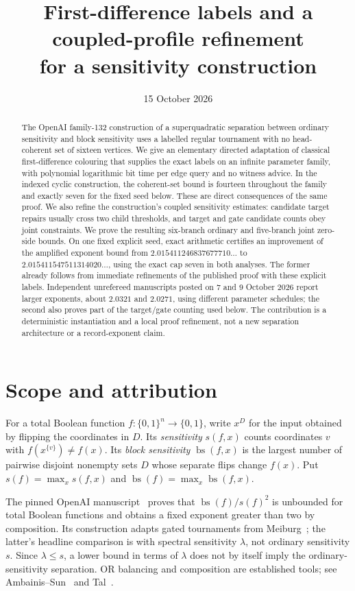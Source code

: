 \documentclass[11pt]{amsart}
\title[Explicit labels and refined sensitivity profiles]{First-difference labels and a coupled-profile refinement\texorpdfstring{\\}{} for a sensitivity construction}
\date{15 October 2026}
\theoremstyle{definition}
\theoremstyle{remark}
\newcommand{\bs}{\operatorname{bs}}
\begin{document}
\begin{abstract}
The OpenAI family-132 construction of a superquadratic separation between
ordinary sensitivity and block sensitivity uses a labelled regular tournament
with no head-coherent set of sixteen vertices. We give an elementary directed
adaptation of classical first-difference colouring that supplies the exact
labels on an infinite parameter family, with polynomial logarithmic bit time
per edge query and no witness advice. In the indexed cyclic construction,
the coherent-set bound is fourteen throughout the family and exactly seven
for the fixed seed below. These are direct consequences of the same proof.
We also refine the construction's
coupled sensitivity estimates: candidate target repairs usually cross two
child thresholds, and target and gate candidate counts obey joint constraints.
We prove the resulting six-branch ordinary and five-branch joint zero-side
bounds. On one fixed explicit seed, exact arithmetic certifies an improvement
of the amplified exponent bound from
$2.015411246837677710\ldots$ to $2.015411547511314020\ldots$,
using the exact cap seven in both analyses. The former already follows from
immediate refinements of the published proof with these explicit labels.
Independent unrefereed manuscripts posted on 7 and 9 October 2026 report
larger exponents, about $2.0321$ and $2.0271$, using different parameter
schedules; the second also proves part of the target/gate counting used
below.
The contribution is a deterministic instantiation and a local proof
refinement, not a new separation architecture or a record-exponent claim.
\end{abstract}
\maketitle

\section{Scope and attribution}
For a total Boolean function $f:\{0,1\}^n\to\{0,1\}$, write $x^D$ for
the input obtained by flipping the coordinates in $D$. Its \emph{sensitivity}
$s(f,x)$ counts coordinates $v$ with $f(x^{\{v\}})\ne f(x)$.
Its \emph{block sensitivity} $\bs(f,x)$ is the largest number of pairwise
disjoint nonempty sets $D$ whose separate flips change $f(x)$. Put
$s(f)=\max_xs(f,x)$ and $\bs(f)=\max_x\bs(f,x)$.

The pinned OpenAI manuscript~\cite{OpenAI132} proves that
$\bs(f)/s(f)^2$ is unbounded for total Boolean functions and obtains a
fixed exponent greater than two by composition. Its construction adapts
gated tournaments from Meiburg~\cite{Meiburg}; the latter's headline
comparison is with spectral sensitivity $\lambda$, not ordinary
sensitivity $s$. Since $\lambda\le s$, a lower bound in terms of
$\lambda$ does not by itself imply the ordinary-sensitivity separation.
OR balancing and composition are established tools; see
Ambainis--Sun~\cite{AmbainisSun} and Tal~\cite{Tal}.
\end{document}

